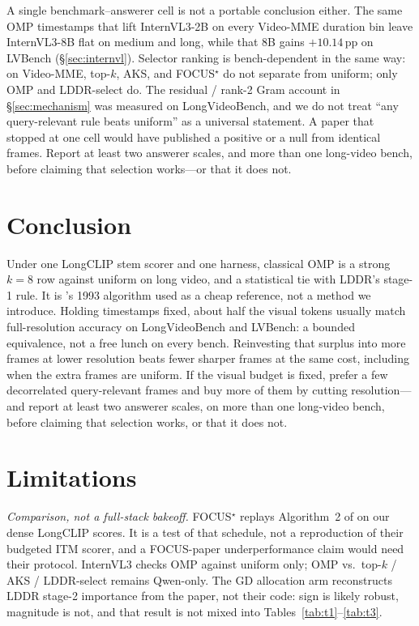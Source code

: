 \documentclass[11pt]{article}
\begin{document}
A single benchmark--answerer cell is not a portable conclusion either.
The same OMP timestamps that lift InternVL3-2B on every Video-MME duration bin leave InternVL3-8B flat on medium and long, while that 8B gains ${+}10.14$\,pp on LVBench (\S\ref{sec:internvl}).
Selector ranking is bench-dependent in the same way: on Video-MME, top-$k$, AKS, and FOCUS$^\star$ do not separate from uniform; only OMP and LDDR-select do.
The residual / rank-2 Gram account in \S\ref{sec:mechanism} was measured on LongVideoBench, and we do not treat ``any query-relevant rule beats uniform'' as a universal statement.
A paper that stopped at one cell would have published a positive or a null from identical frames.
Report at least two answerer scales, and more than one long-video bench, before claiming that selection works---or that it does not.

\section{Conclusion}
\label{sec:conclusion}

Under one LongCLIP stem scorer and one harness, classical OMP is a strong $k{=}8$ row against uniform on long video, and a statistical tie with LDDR's stage-1 rule.
It is \citet{pati1993omp}'s 1993 algorithm used as a cheap reference, not a method we introduce.
Holding timestamps fixed, about half the visual tokens usually match full-resolution accuracy on LongVideoBench and LVBench: a bounded equivalence, not a free lunch on every bench.
Reinvesting that surplus into more frames at lower resolution beats fewer sharper frames at the same cost, including when the extra frames are uniform.
If the visual budget is fixed, prefer a few decorrelated query-relevant frames and buy more of them by cutting resolution---and report at least two answerer scales, on more than one long-video bench, before claiming that selection works, or that it does not.

\section{Limitations}
\label{sec:limitations}

\emph{Comparison, not a full-stack bakeoff.}
FOCUS$^\star$ replays Algorithm~2 of \citet{zhu2025focus} on our dense LongCLIP scores.
It is a test of that schedule, not a reproduction of their budgeted ITM scorer, and a FOCUS-paper underperformance claim would need their protocol.
InternVL3 checks OMP against uniform only; OMP vs.\ top-$k$ / AKS / LDDR-select remains Qwen-only.
The GD allocation arm reconstructs LDDR stage-2 importance from the paper, not their code: sign is likely robust, magnitude is not, and that result is not mixed into Tables~\ref{tab:t1}--\ref{tab:t3}.
\end{document}
